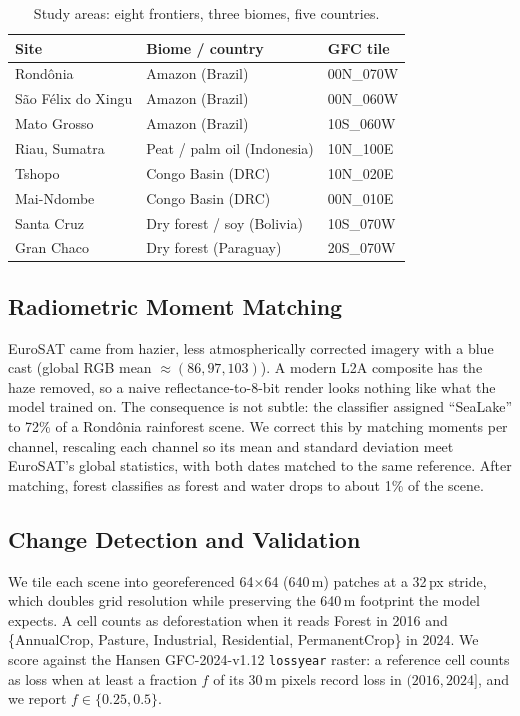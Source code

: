 \documentclass[journal]{IEEEtran}
\begin{document}
\begin{table}[!t]
\caption{Study areas: eight frontiers, three biomes, five countries.}
\label{tab:sites}
\centering
\begin{tabular}{lll}
\toprule
Site & Biome / country & GFC tile \\
\midrule
Rond\^onia & Amazon (Brazil) & 00N\_070W \\
S\~ao F\'elix do Xingu & Amazon (Brazil) & 00N\_060W \\
Mato Grosso & Amazon (Brazil) & 10S\_060W \\
Riau, Sumatra & Peat / palm oil (Indonesia) & 10N\_100E \\
Tshopo & Congo Basin (DRC) & 10N\_020E \\
Mai-Ndombe & Congo Basin (DRC) & 00N\_010E \\
Santa Cruz & Dry forest / soy (Bolivia) & 10S\_070W \\
Gran Chaco & Dry forest (Paraguay) & 20S\_070W \\
\bottomrule
\end{tabular}
\end{table}

\subsection{Radiometric Moment Matching}
EuroSAT came from hazier, less atmospherically corrected imagery with a blue cast
(global RGB mean $\approx(86,97,103)$). A modern L2A composite has the haze
removed, so a naive reflectance-to-8-bit render looks nothing like what the model
trained on. The consequence is not subtle: the classifier assigned ``SeaLake'' to
72\% of a Rond\^onia rainforest scene. We correct this by matching moments per
channel, rescaling each channel so its mean and standard deviation meet EuroSAT's
global statistics, with both dates matched to the same reference. After matching,
forest classifies as forest and water drops to about 1\% of the scene.

\subsection{Change Detection and Validation}
We tile each scene into georeferenced 64$\times$64 (640\,m) patches at a 32\,px
stride, which doubles grid resolution while preserving the 640\,m footprint the
model expects. A cell counts as deforestation when it reads Forest in 2016 and
\{AnnualCrop, Pasture, Industrial, Residential, PermanentCrop\} in 2024. We score
against the Hansen GFC-2024-v1.12 \texttt{lossyear} raster: a reference cell counts
as loss when at least a fraction $f$ of its 30\,m pixels record loss in
$(2016,2024]$, and we report $f\in\{0.25,0.5\}$.
\end{document}
